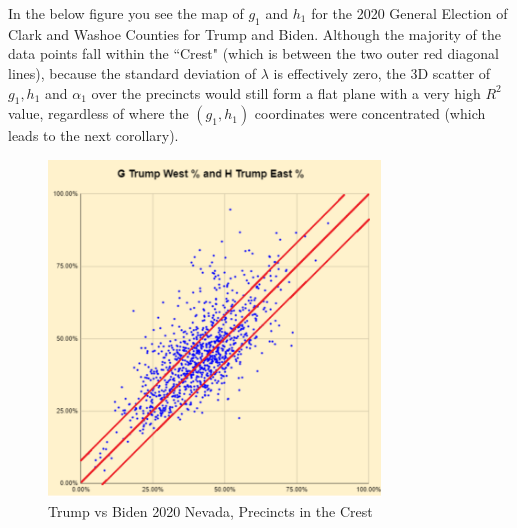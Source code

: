 In the below figure you see the map of $g_{1}$ and $h_{1}$ for the 2020 General Election of Clark and Washoe Counties for Trump and Biden. Although the majority of the data points fall within the ``Crest" (which is between the two outer red diagonal lines), because the standard deviation of $\lambda$ is effectively zero, the 3D scatter of $g_{1},h_{1}$ and $\alpha_{1}$ over the precincts would still form a flat plane with a very high $R^2$ value, regardless of where the $(g_{1},h_{1})$ coordinates were concentrated (which leads to the next corollary).
\begin{figure}[bp!]
\begin{center}
\caption{Trump vs Biden 2020 Nevada, Precincts in the Crest}
\includegraphics[width=250pt]{Twixt Lemma.png}
\end{center}
\end{figure}
\newpage
